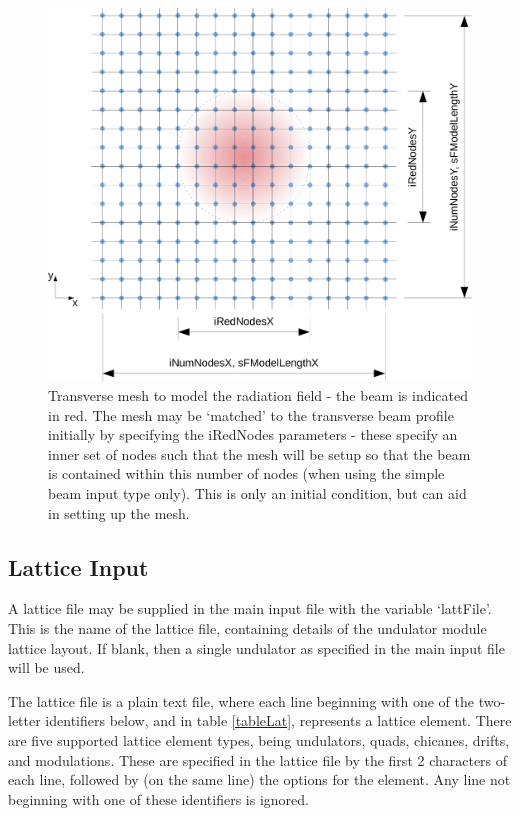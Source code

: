 \documentclass[12pt]{article}%
\begin{document}
\begin{figure}
\centering
\includegraphics[width=150mm]{trans_mesh2.png}
\caption{Transverse mesh to model the radiation field - the beam is indicated in red. The mesh may be `matched' to the transverse beam profile initially by specifying the iRedNodes parameters - these specify an inner set of nodes such that the mesh will be setup so that the beam is contained within this number of nodes (when using the simple beam input type only). This is only an initial condition, but can aid in setting up the mesh.}
\label{trmsh}
\end{figure}



\subsection{Lattice Input}

\label{latt-file}

A lattice file may be supplied in the main input file with the variable `lattFile'. This is the name of the lattice file, containing details of the undulator module lattice layout. If blank, then a single undulator as specified in the main input file will be used.

The lattice file is a plain text file, where each line beginning with one of the two-letter identifiers below, and in table \ref{tableLat}, represents a lattice element. There are five supported lattice element types, being undulators, quads, chicanes, drifts, and modulations. These are specified in the lattice file by the first 2 characters of each line, followed by (on the same line) the options for the element. Any line not beginning with one of these identifiers is ignored.
\end{document}
